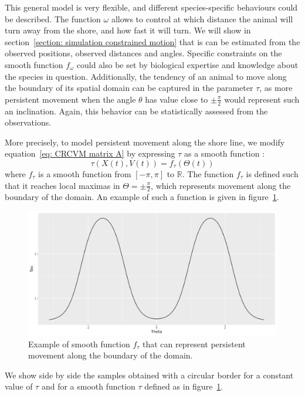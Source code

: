 \documentclass[11pt]{article}
\newcommand {\R}{\mathbb{R}}
\newcommand {\1}{\mathbb{1}}
\theoremstyle{definition}
\theoremstyle{remark}
\theoremstyle{remark}
\begin{document}
 This general model is very flexible, and different species-specific behaviours could be described. The function $\omega$ allows to control at which distance the animal will turn away from the shore, and how fast it will turn. We will show in section~\ref{section: simulation constrained motion} that is can be estimated from the observed positions, observed distances and angles. Specific constraints on the smooth function $f_{\omega}$ could also be set by biological expertise and knowledge about the species in question. Additionally, the tendency of an animal to move along the boundary of its spatial domain can be captured in the parameter $\tau$, as more persistent movement when the angle $\theta$ has value close to $\pm\frac{\pi}{2}$ would represent such an inclination. Again, this behavior can be statistically assessed from the observations. 
 
 More precisely, to model persistent movement along the shore line, we modify equation~\ref{eq: CRCVM matrix A} by expressing $\tau$ as a smooth function :
 \[\tau(X(t),V(t))=f_{\tau}(\Theta(t))\] where $f_{\tau}$ is a smooth function from $[-\pi,\pi]$ to $\R$.
 The function $f_{\tau}$ is defined such that it reaches local maximas in $\Theta=\pm\frac{\pi}{2}$, which represents movement along the boundary of the domain. An example of such a function is given in figure~\ref{fig:smoothtaubump}.
 \begin{figure}[H]
 	\centering
 	\includegraphics[scale=0.3]{images/crcvm/smooth_tau_bump}
 	\caption{Example of smooth function $f_{\tau}$ that can represent persistent movement along the boundary of the domain.}
 	\label{fig:smoothtaubump}
 \end{figure}
 
 We show side by side the samples obtained with a circular border for a constant value of $\tau$ and for a smooth function $\tau$ defined as in figure~\ref{fig:smoothtaubump}.
 
\end{document}
